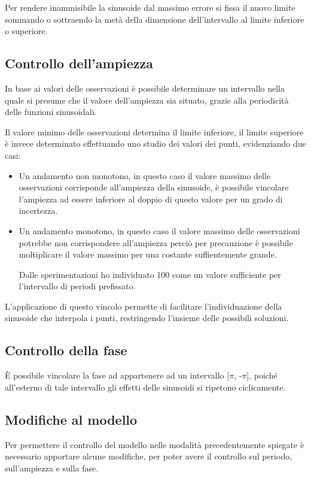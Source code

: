 \documentclass[a4paper,12pt]{report}
\begin{document}
Per rendere inammisibile la sinusoide dal massimo errore si fissa il nuovo limite sommando o sottraendo la metà della dimensione dell'intervallo al limite inferiore o superiore.

\subsection{Controllo dell'ampiezza}
\label{con:ampiezza}
In base ai valori delle osservazioni è possibile  determinare un intervallo nella quale si presume che il valore dell'ampiezza sia situato, grazie alla periodicità delle funzioni sinusoidali.

Il valore minimo delle osservazioni determina il limite inferiore,
il limite superiore è invece determinato effettuando uno studio dei valori dei punti, evidenziando due casi:
\begin{itemize}
  \item Un andamento non monotono, in questo caso il valore massimo delle osservazioni corrisponde all'ampiezza della sinusoide, è possibile vincolare l'ampiezza ad essere inferiore al doppio di questo valore per un grado di incertezza.
  \item Un andamento monotono, in questo caso il valore massimo delle osservazioni potrebbe non corrispondere all'ampiezza perciò per precauzione è possibile moltiplicare il valore massimo per una costante suffientemente grande.

  Dalle sperimentazioni ho individuato 100  come un valore sufficiente per l'intervallo di periodi prefissato.
\end{itemize}

L'applicazione di questo vincolo permette di facilitare l'individuazione della sinusoide che interpola i punti, restringendo l'insieme delle possibili soluzioni.

\subsection{Controllo della fase}
È possibile vincolare la fase ad appartenere ad un intervallo [$\pi$, -$\pi$], poiché all'esterno di tale intervallo gli effetti delle sinusoidi si ripetono ciclicamente.

\subsection{Modifiche al modello}
Per permettere il controllo del modello nelle modalità precedentemente spiegate è necessario apportare alcune modifiche, per poter avere il controllo sul periodo, sull'ampiezza e sulla fase.
\end{document}

